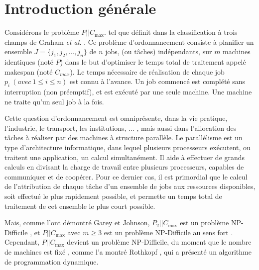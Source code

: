 \documentclass[a4paper,12pt]{report}
\theoremstyle{plain}				%
\theoremstyle{definition}				%
\newcommand\problemGrahamPII{$P_2||C_{\max}$\xspace}	%
\newcommand\problemGrahamP{$P||C_{\max}$\xspace}
\begin{document}
\bigskip


\section{Introduction générale} \label{sec:introductionGenerale}

Considérons le problème \problemGrahamP. tel que définit 
  dans la classification à trois champs de 
  Graham \emph{et al.} \cite{graham1979optimization}. 
Ce problème d'ordonnancement consiste à planifier 
  un ensemble $J=\{j_1, j_2, \ldots, j_n\}$ de $n$ jobs, (ou tâches) indépendants, 
  sur $m$ machines identiques (noté $P$) 
  dans le but d'optimiser le temps total de traitement appelé makespan 
  (noté $C_{max}$).
Le temps nécessaire de réalisation de chaque job $p_i~(avec~1 \leq i \leq n)$ 
  est connu à l'avance. 
Un job commencé est complété sans interruption (non préemptif), 
  et est exécuté par une seule machine. 
Une machine ne traite qu'un seul job à la fois. 

Cette question d’ordonnancement est omniprésente, dans la vie 
  pratique, l'industrie, le transport, les institutions, $\ldots$ , 
  mais aussi dans l'allocation des tâches à réaliser par des 
  machines à structure parallèle. 
Le parallélisme est un type d'architecture informatique, dans lequel 
  plusieurs processeurs exécutent, ou traitent
  une application, un calcul simultanément. 
Il aide à effectuer de grands calculs en divisant la charge de travail 
  entre plusieurs processeurs, capables de communiquer et de coopérer. 
Pour ce dernier cas, il est primordial que le calcul de l'attribution 
  de chaque tâche d'un ensemble de jobs aux ressources disponibles, 
  soit effectué le plus rapidement possible, 
  et permette un temps total de traitement de cet ensemble 
  le plus court possible.

\bigskip
Mais, comme l'ont démontré Garey et Johnson, 
  \problemGrahamPII est un problème NP-Difficile \cite{garey1978strong}, et 
  \problemGrahamP avec $m \geq 3$ est un problème NP-Difficile 
  au sens fort \cite{garey1982computers}. 
Cependant, \problemGrahamP devient un problème NP-Difficile, 
  du moment que le nombre de machines est fixé \cite{chen1999potts}, 
  comme l'a montré Rothkopf \cite{rothkopf1966scheduling}, 
  qui a présenté un algorithme de programmation dynamique.
\end{document}
